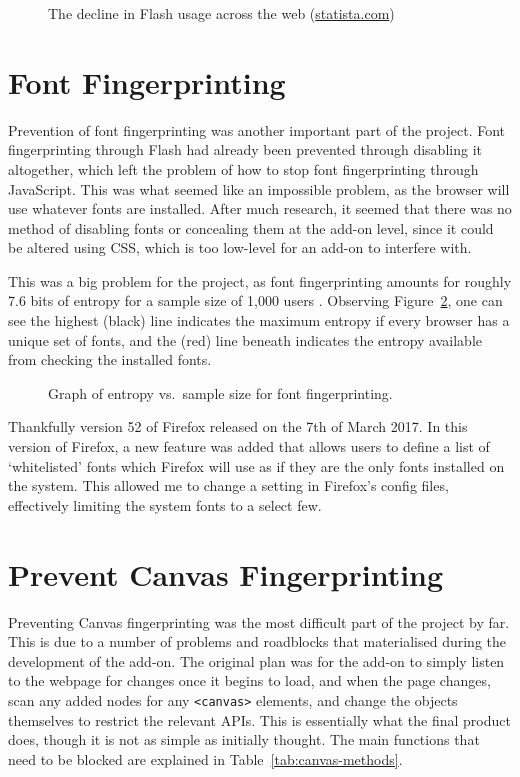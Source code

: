 \begin{figure}[h]
\centering
\caption{The decline in Flash usage across the web (\url{statista.com})}
\label{fig:flash-usage}
\end{figure}

\section{Font Fingerprinting}

Prevention of font fingerprinting was another important part of the project.
Font fingerprinting through Flash had already been prevented through disabling it altogether, which left the problem of how to stop font fingerprinting through JavaScript.
This was what seemed like an impossible problem, as the browser will use whatever fonts are installed.
After much research, it seemed that there was no method of disabling fonts or concealing them at the add-on level, since it could be altered using CSS, which is too low-level for an add-on to interfere with.

This was a big problem for the project, as font fingerprinting amounts for roughly 7.6 bits of entropy for a sample size of 1,000 users \citep{font-metrics}.
Observing Figure~\ref{fig:font-metrics}, one can see the highest (black) line indicates the maximum entropy if every browser has a unique set of fonts, and the (red) line beneath indicates the entropy available from checking the installed fonts.

\begin{figure}[h]
\centering
\caption{Graph of entropy vs.\ sample size for font fingerprinting. \citep{font-metrics}}
\label{fig:font-metrics}
\end{figure}

Thankfully version 52 of Firefox released on the 7th of March 2017.
In this version of Firefox, a new feature was added that allows users to define a list of `whitelisted' fonts which Firefox will use as if they are the only fonts installed on the system.
This allowed me to change a setting in Firefox's config files, effectively limiting the system fonts to a select few.

\section{Prevent Canvas Fingerprinting}

Preventing Canvas fingerprinting was the most difficult part of the project by far.
This is due to a number of problems and roadblocks that materialised during the development of the add-on.
The original plan was for the add-on to simply listen to the webpage for changes once it begins to load, and when the page changes, scan any added nodes for any \texttt{<canvas>} elements, and change the objects themselves to restrict the relevant APIs.
This is essentially what the final product does, though it is not as simple as initially thought.
The main functions that need to be blocked are explained in Table~\ref{tab:canvas-methods}.

